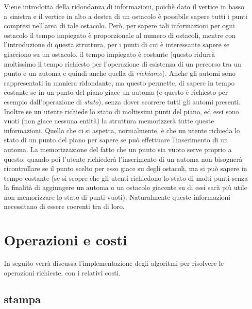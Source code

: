 \documentclass[a4paper,11pt]{article}
\begin{document}
Viene introdotta della ridondanza di informazioni, poichè dato il vertice in basso a sinistra e il vertice in alto a destra di un ostacolo è possibile sapere tutti i punti compresi nell'area di tale ostacolo. Però, per sapere tali informazioni per ogni ostacolo il tempo impiegato è proporzionale al numero di ostacoli, mentre con l'introduzione di questa struttura, per i punti di cui è interessante sapere se giacciono su un ostacolo, il tempo impiegato è costante (questo ridurrà moltissimo il tempo richiesto per l'operazione di esistenza di un percorso tra un punto e un automa e quindi anche quella di \textit{richiamo}). Anche gli automi sono rappresentati in maniera ridondante, ma questo permette, di sapere in tempo costante se in un punto del piano giace un automa (e questo è richiesto per esempio dall'operazione di \textit{stato}), senza dover scorrere tutti gli automi presenti. \\
Inoltre se un utente richiede lo stato di moltissimi punti del piano, ed essi sono vuoti (non giace nessuna entità) la struttura memorizzerà tutte queste informazioni. Quello che ci si aspetta, normalmente, è che un utente richieda lo stato di un punto del piano per sapere se può effettuare l'inserimento di un automa. La memorizzazione del fatto che un punto sia vuoto serve proprio a questo: quando poi l'utente richiederà l'inserimento di un automa non bisognerà ricontrollare se il punto scelto per esso giace su degli ostacoli, ma si può sapere in tempo costante (se si scopre che gli utenti richiedono lo stato di molti punti senza la finalità di aggiungere un automa o un ostacolo giacente su di essi sarà più utile non memorizzare lo stato di punti vuoti). Naturalmente queste informazioni necessitano di essere coerenti tra di loro.


\section{Operazioni e costi}

In seguito verrà discussa l'implementazione degli algoritmi per risolvere le operazioni richieste, con i relativi costi. 


\subsection{stampa}
\end{document}
